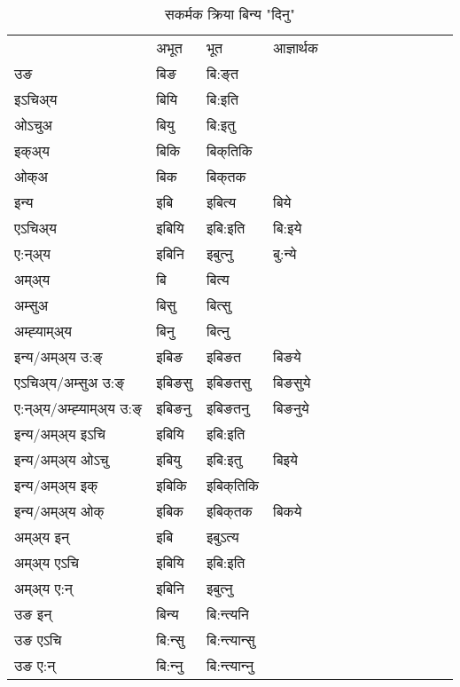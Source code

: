 \begin{table}[H]
\label{i.vt} \centering
\caption{सकर्मक क्रिया  बिन्य  "दिनु"  }
\begin{tabular}{l|l|l|l|l|l|l|l|l|l|l|l|l}  \toprule
&अभूत & भूत & आज्ञार्थक \\ 
उङ &बिङ &बि:ङ्‌त \\ 
इऽचिअ्य &बियि &बि:इति   \\ 
ओऽचुअ &बियु &बि:इतु   \\ 
इक्अ्य &बिकि &बिक्‌तिकि   \\ 
ओक्अ &बिक &बिक्‌तक   \\ 
इन्य & इबि & इबित्य &बिये  \\ 
एऽचिअ्य & इबियि & इबि:इति &बि:इये    \\ 
ए:न्अ्य & इबिनि  & इबुत्‍नु &बु:न्ये  \\ 
अम्अ्य & बि & बित्य   \\ 
अम्सुअ & बिसु & बित्सु     \\ 
अम्ह्‍याम्अ्य & बिनु  & बित्‍नु \\ 
\midrule
इन्य/अम्अ्य उ:ङ्‌&इबिङ &इबिङत &बिङये \\ 
एऽचिअ्य/अम्सुअ उ:ङ्‌ &इबिङसु &इबिङतसु &बिङसुये \\ 
ए:न्अ्य/अम्ह्‍याम्अ्य उ:ङ्‌ &इबिङनु &इबिङतनु &बिङनुये \\ 
इन्य/अम्अ्य इऽचि &इबियि &इबि:इति    \\ 
इन्य/अम्अ्य ओऽचु &इबियु &इबि:इतु  &बिइये  \\ 
इन्य/अम्अ्य इक् &इबिकि &इबिक्‌तिकि   \\ 
इन्य/अम्अ्य ओक् &इबिक &इबिक्‌तक  &बिकये  \\ 
अम्अ्य इन् & इबि & इबुऽत्य   \\ 
अम्अ्य एऽचि & इबियि & इबि:इति     \\ 
अम्अ्य ए:न् & इबिनि  & इबुत्‍नु  \\ 
\midrule
उङ इन् & बिन्य  & बि:न्त्यनि  \\ 
उङ एऽचि & बि:न्सु  & बि:न्त्यान्सु   \\ 
उङ ए:न्& बि:न्‍नु  & बि:न्त्यान्‍नु   \\ 
\bottomrule
\end{tabular}
\end{table}


